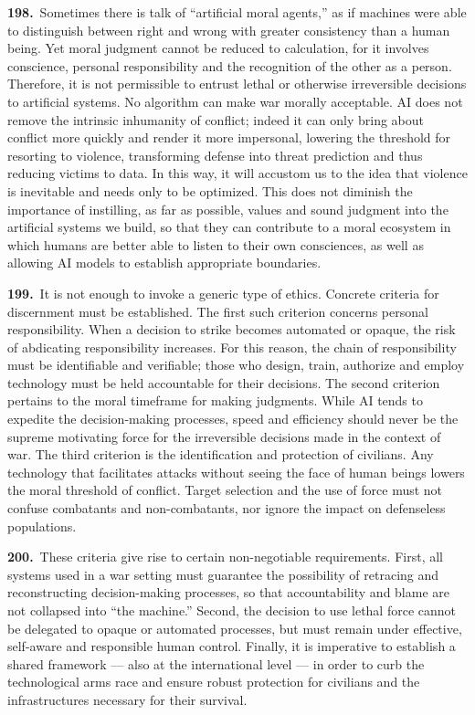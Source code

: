 \documentclass{article}
\begin{document}
\textbf{198.}\ Sometimes there is talk of ``artificial moral agents,'' as if machines were able to distinguish between right and wrong with greater consistency than a human being. Yet moral judgment cannot be reduced to calculation, for it involves conscience, personal responsibility and the recognition of the other as a person. Therefore, it is not permissible to entrust lethal or otherwise irreversible decisions to artificial systems. No algorithm can make war morally acceptable. AI does not remove the intrinsic inhumanity of conflict; indeed it can only bring about conflict more quickly and render it more impersonal, lowering the threshold for resorting to violence, transforming defense into threat prediction and thus reducing victims to data. In this way, it will accustom us to the idea that violence is inevitable and needs only to be optimized. This does not diminish the importance of instilling, as far as possible, values and sound judgment into the artificial systems we build, so that they can contribute to a moral ecosystem in which humans are better able to listen to their own consciences, as well as allowing AI models to establish appropriate boundaries.

\textbf{199.}\ It is not enough to invoke a generic type of ethics. Concrete criteria for discernment must be established. The first such criterion concerns personal responsibility. When a decision to strike becomes automated or opaque, the risk of abdicating responsibility increases. For this reason, the chain of responsibility must be identifiable and verifiable; those who design, train, authorize and employ technology must be held accountable for their decisions. The second criterion pertains to the moral timeframe for making judgments. While AI tends to expedite the decision-making processes, speed and efficiency should never be the supreme motivating force for the irreversible decisions made in the context of war. The third criterion is the identification and protection of civilians. Any technology that facilitates attacks without seeing the face of human beings lowers the moral threshold of conflict. Target selection and the use of force must not confuse combatants and non-combatants, nor ignore the impact on defenseless populations.

\textbf{200.}\ These criteria give rise to certain non-negotiable requirements. First, all systems used in a war setting must guarantee the possibility of retracing and reconstructing decision-making processes, so that accountability and blame are not collapsed into ``the machine.'' Second, the decision to use lethal force cannot be delegated to opaque or automated processes, but must remain under effective, self-aware and responsible human control. Finally, it is imperative to establish a shared framework --- also at the international level --- in order to curb the technological arms race and ensure robust protection for civilians and the infrastructures necessary for their survival.
\end{document}
